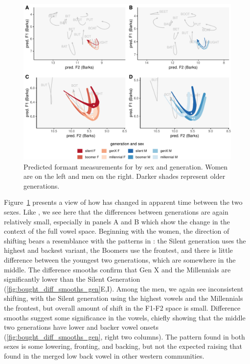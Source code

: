 \begin{figure}[tb!]
	\centering
	\includegraphics[width = 6.5in]{Figures/BOUGHT/BOUGHT_four_panel_plot.pdf}
	\caption[Predicted formant measurements for \thought by sex and generation.]{Predicted formant measurements for \thought by sex and generation. Women are on the left and men on the right. Darker shades represent older generations.}
	\label{fig:BOUGHT_four_panel}
\end{figure}

Figure~\ref{fig:BOUGHT_four_panel} presents a view of how \thought has changed in apparent time between the two sexes. Like \lot, we see here that the differences between generations are again relatively small, especially in panels A and B which show the change in the context of the full vowel space. Beginning with the women, the direction of shifting bears a resemblance with the patterns in \lot: the Silent generation uses the highest and backest variant, the Boomers use the frontest, and there is little difference between the youngest two generations, which are somewhere in the middle. The difference smooths confirm that Gen X and the Millennials are significantly lower than the Silent Generation (\ref{fig:bought_diff_smooths_gen}E,I). Among the men, we again see inconsistent shifting, with the Silent generation using the highest vowels and the Millennials the frontest, but overall amount of shift in the F1-F2 space is small. Difference smooths suggest some significance in the vowels, chiefly showing that the middle two generations have lower and backer vowel onsets (\ref{fig:bought_diff_smooths_gen}, right two columns). The pattern found in both sexes is some lowering, fronting, and backing, but not the expected raising that found in the merged low back vowel in other western communities.

